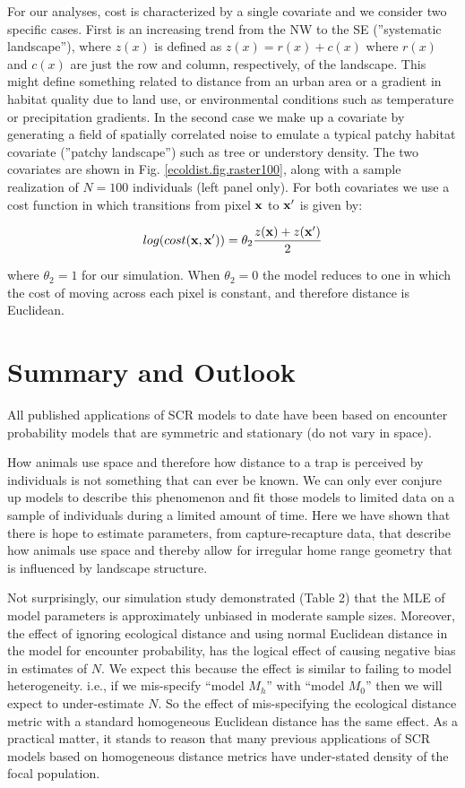 For our analyses, cost is characterized by a single covariate 
and we consider two specific cases. First is an increasing trend from
the NW to the SE (''systematic landscape''), where $z(x)$ is defined as
$z(x) = r(x) + c(x)$ where $r(x)$ and $c(x)$ are just the row and
column, respectively, of the landscape.  This might define something
related to distance from an urban area or a gradient in habitat
quality due to land use, or environmental conditions such as
temperature or precipitation gradients.  In the second case we make up
a covariate by generating a field of spatially correlated noise to
emulate a typical patchy habitat covariate (''patchy landscape'') such as
tree or understory density. The two covariates are shown in
Fig. \ref{ecoldist.fig.raster100}, along with a sample realization of
$N=100$ individuals (left panel only).  For both covariates we use a
cost function in which transitions from pixel ${\bf x}$ to ${\bf x}'$
is given by:

\[
 log(cost({\bf x},{\bf x}'))=  \theta_2 \frac{z({\bf x}) + z({\bf x}')}{2}
\]

{\flushleft where} $\theta_2 = 1$ for our simulation.
When $\theta_2=0$ the
model reduces to one in which the cost of moving across each pixel is
constant, and therefore distance is Euclidean.


\section{Summary and Outlook}


All published applications of SCR models to date have been based on
encounter probability models that are symmetric and stationary (do not
vary in space).


How animals use space and therefore how distance to a trap is
perceived by individuals is not something that can ever be known. We
can only ever conjure up models to describe this phenomenon and fit
those models to limited data on a sample of individuals during a
limited amount of time.  Here we have shown that there is hope to
estimate parameters, from capture-recapture data, that describe how
animals use space and thereby allow for irregular home range geometry
that is influenced by landscape structure.

Not surprisingly, our simulation study demonstrated
(Table 2) that the MLE of model parameters is
approximately unbiased in moderate sample sizes. Moreover, the effect
of ignoring ecological distance and using normal Euclidean distance in
the model for encounter probability, has the logical effect of causing
negative bias in estimates of $N$.  We expect this because the effect
is similar to failing to model heterogeneity. i.e., if we mis-specify
``model $M_h$'' \citep{otis_etal:1978} with ``model $M_0$''
\citep{otis_etal:1978} then we will expect to under-estimate $N$. So
the effect of mis-specifying the ecological distance metric with a
standard homogeneous Euclidean distance has the same effect. As a
practical matter, it stands to reason that many previous applications
of SCR models based on homogeneous distance metrics have under-stated
density of the focal population.

